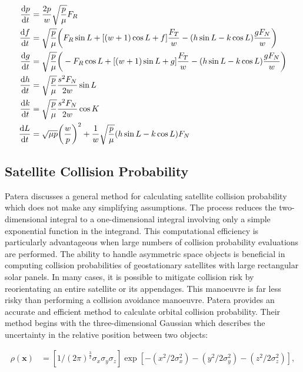 \begin{equation}
    \begin{aligned}
        \dv{p}{t}&=\frac{2p}{w}\sqrt{\frac{p}{\mu}}F_R\\
        \dv{f}{t}&=\sqrt{\frac{p}{\mu}}\bigg(F_R\sin{L}+[(w+1)\cos{L}+f]\frac{F_T}{w}-(h\sin{L}-k\cos{L})\frac{gF_N}{w}\bigg)\\
        \dv{g}{t}&=\sqrt{\frac{p}{\mu}}\bigg(-F_R\cos{L}+[(w+1)\sin{L}+g]\frac{F_T}{w}-(h\sin{L}-k\cos{L})\frac{gF_N}{w}\bigg)\\
        \dv{h}{t}&=\sqrt{\frac{p}{\mu}}\frac{s^2F_N}{2w}\sin{L}\\
        \dv{k}{t}&=\sqrt{\frac{p}{\mu}}\frac{s^2F_N}{2w}\cos{K}\\
        \dv{L}{t}&=\sqrt{\mu{p}}\bigg(\frac{w}{p}\bigg)^2+\frac{1}{w}\sqrt{\frac{p}{\mu}}(h\sin{L}-k\cos{L})F_N\\
    \end{aligned}
\end{equation}


\newpage\subsection{Satellite Collision Probability}

Patera \cite{Patera2001} discusses a general method for calculating satellite collision probability which does not make any simplifying assumptions. The process reduces the two-dimensional integral to a one-dimensional integral involving only a simple exponential function in the integrand. This computational efficiency is particularly advantageous when large numbers of collision probability evaluations are performed. The ability to handle asymmetric space objects is beneficial in computing collision probabilities of geostationary satellites with large rectangular solar panels. In many cases, it is possible to mitigate collision risk by reorientating an entire satellite or its appendages. This manoeuvre is far less risky than performing a collision avoidance manoeuvre. Patera provides an accurate and efficient method to calculate orbital collision probability. Their method begins with the three-dimensional Gaussian which describes the uncertainty in the relative position between two objects:

\begin{equation}
    \begin{aligned}
        \rho(\boldsymbol{x}) &=\left[1 /(2 \pi)^{\frac{3}{2}} \sigma_{x} \sigma_{y} \sigma_{z}\right] \exp \left[-\left(x^{2} / 2 \sigma_{x}^{2}\right)-\left(y^{2} / 2 \sigma_{y}^{2}\right)-\left(z^{2} / 2 \sigma_{z}^{2}\right)\right],
    \end{aligned}
    \label{eq:collision_3d_gaussian}
\end{equation}

